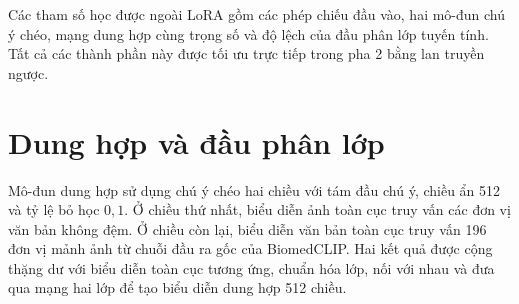 Các tham số học được ngoài LoRA gồm các phép chiếu đầu vào, hai mô-đun chú ý chéo, mạng dung hợp cùng trọng số và độ lệch của đầu phân lớp tuyến tính. Tất cả các thành phần này được tối ưu trực tiếp trong pha 2 bằng lan truyền ngược.

\section{Dung hợp và đầu phân lớp}

Mô-đun dung hợp sử dụng chú ý chéo hai chiều với tám đầu chú ý, chiều ẩn 512 và tỷ lệ bỏ học $0{,}1$. Ở chiều thứ nhất, biểu diễn ảnh toàn cục truy vấn các đơn vị văn bản không đệm. Ở chiều còn lại, biểu diễn văn bản toàn cục truy vấn 196 đơn vị mảnh ảnh từ chuỗi đầu ra gốc của BiomedCLIP. Hai kết quả được cộng thặng dư với biểu diễn toàn cục tương ứng, chuẩn hóa lớp, nối với nhau và đưa qua mạng hai lớp để tạo biểu diễn dung hợp 512 chiều.

\begin{table}[htbp]
\centering
{}
\caption{Cấu hình mô-đun dung hợp và đầu phân lớp}
\label{tab:appendix-model-fusion-classifier}
\end{table}

